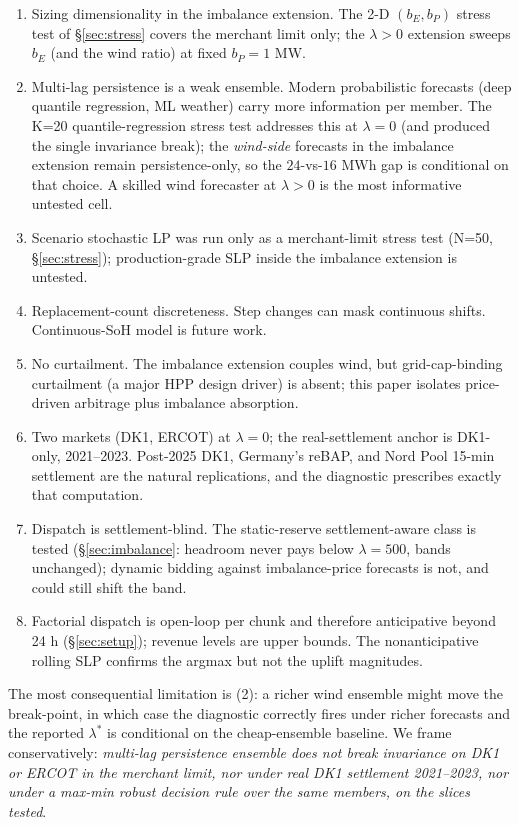 \documentclass[11pt]{article}
\begin{document}
\begin{enumerate}
\item Sizing dimensionality in the imbalance extension. The 2-D $(b_E, b_P)$ stress test of \S\ref{sec:stress} covers the merchant limit only; the $\lambda > 0$ extension sweeps $b_E$ (and the wind ratio) at fixed $b_P = 1$ MW.
\item Multi-lag persistence is a weak ensemble. Modern probabilistic forecasts (deep quantile regression, ML weather) carry more information per member. The K=20 quantile-regression stress test addresses this at $\lambda = 0$ (and produced the single invariance break); the \emph{wind-side} forecasts in the imbalance extension remain persistence-only, so the $24$-vs-$16$ MWh gap is conditional on that choice. A skilled wind forecaster at $\lambda > 0$ is the most informative untested cell.
\item Scenario stochastic LP \citep{birge1997stochastic, krishnamurthy2018stochastic} was run only as a merchant-limit stress test (N=50, \S\ref{sec:stress}); production-grade SLP inside the imbalance extension is untested.
\item Replacement-count discreteness. Step changes can mask continuous shifts. Continuous-SoH model is future work.
\item No curtailment. The imbalance extension couples wind, but grid-cap-binding curtailment (a major HPP design driver) is absent; this paper isolates price-driven arbitrage plus imbalance absorption.
\item Two markets (DK1, ERCOT) at $\lambda = 0$; the real-settlement anchor is DK1-only, 2021--2023. Post-2025 DK1, Germany's reBAP, and Nord Pool 15-min settlement are the natural replications, and the diagnostic prescribes exactly that computation.
\item Dispatch is settlement-blind. The static-reserve settlement-aware class is tested (\S\ref{sec:imbalance}: headroom never pays below $\lambda = 500$, bands unchanged); dynamic bidding against imbalance-price forecasts is not, and could still shift the band.
\item Factorial dispatch is open-loop per chunk and therefore anticipative beyond 24 h (\S\ref{sec:setup}); revenue levels are upper bounds. The nonanticipative rolling SLP confirms the argmax but not the uplift magnitudes.
\end{enumerate}

The most consequential limitation is (2): a richer wind ensemble might move the break-point, in which case the diagnostic correctly fires under richer forecasts and the reported $\lambda^*$ is conditional on the cheap-ensemble baseline. We frame conservatively: \emph{multi-lag persistence ensemble does not break invariance on DK1 or ERCOT in the merchant limit, nor under real DK1 settlement 2021--2023, nor under a max-min robust decision rule over the same members, on the slices tested}.
\end{document}
